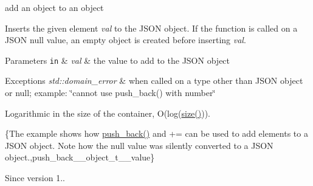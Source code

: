 add an object to an object 

Inserts the given element {\itshape val} to the J\+S\+ON object. If the function is called on a J\+S\+ON null value, an empty object is created before inserting {\itshape val}.


\begin{DoxyParams}[1]{Parameters}
\mbox{\tt in}  & {\em val} & the value to add to the J\+S\+ON object\\
\hline
\end{DoxyParams}

\begin{DoxyExceptions}{Exceptions}
{\em std\+::domain\+\_\+error} & when called on a type other than J\+S\+ON object or null; example\+: {\ttfamily \char`\"{}cannot use push\+\_\+back() with number\char`\"{}}\\
\hline
\end{DoxyExceptions}
Logarithmic in the size of the container, O(log({\ttfamily \hyperlink{classnlohmann_1_1basic__json_a0ea8a1ecca4b3cb0ba09ad7552c364b6}{size()}})).

\{The example shows how {\ttfamily \hyperlink{classnlohmann_1_1basic__json_a486b96adbf4886c38e38c952394a220f}{push\+\_\+back()}} and {\ttfamily +=} can be used to add elements to a J\+S\+ON object. Note how the {\ttfamily null} value was silently converted to a J\+S\+ON object.,push\+\_\+back\+\_\+\+\_\+object\+\_\+t\+\_\+\+\_\+value\}

\begin{DoxySince}{Since}
version 1.. 
\end{DoxySince}
\hypertarget{classnlohmann_1_1basic__json_a9c9b4932b26a9630e1a3f25ea42a2c43}{}\label{classnlohmann_1_1basic__json_a9c9b4932b26a9630e1a3f25ea42a2c43} 
